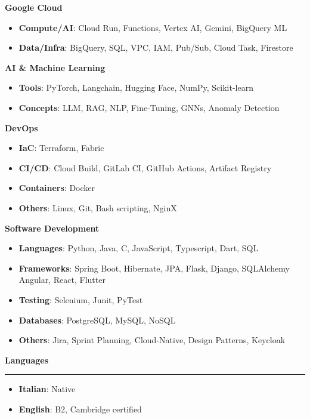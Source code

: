 \documentclass[9pt, a4paper]{article}
\newcommand{\cvsection}[1]{%
	\vspace{2pt}\par
	{\Large\bfseries\color{sectionblue}#1}\par
	\vspace{2pt}\hrule\vspace{6pt}
}
\begin{document}
\begin{minipage}[t]{0.32\linewidth}
		{\bfseries Google Cloud}
		\begin{itemize}[leftmargin=*, nosep, itemsep=2pt]
			\footnotesize
			\item \textbf{Compute/AI}: Cloud Run, Functions, Vertex AI, Gemini, BigQuery ML
			\item \textbf{Data/Infra}: BigQuery, SQL, VPC, IAM, Pub/Sub, Cloud Task, Firestore
		\end{itemize}
		\vspace{6pt}
		
		{\bfseries AI \& Machine Learning}
		\begin{itemize}[leftmargin=*, nosep, itemsep=2pt]
			\footnotesize
			\item \textbf{Tools}: PyTorch, Langchain, Hugging Face, NumPy, Scikit-learn
			\item \textbf{Concepts}: LLM, RAG, NLP, Fine-Tuning, GNNs, Anomaly Detection
		\end{itemize}
		\vspace{6pt}
		
		{\bfseries DevOps}
		\begin{itemize}[leftmargin=*, nosep, itemsep=2pt]
			\footnotesize
			\item \textbf{IaC}: Terraform, Fabric
			\item \textbf{CI/CD}: Cloud Build, GitLab CI, GitHub Actions, Artifact Registry
			\item \textbf{Containers}: Docker
			\item \textbf{Others}: Linux, Git, Bash scripting, NginX
		\end{itemize}
		\vspace{6pt}
		
		{\bfseries Software Development}
		\begin{itemize}[leftmargin=*, nosep, itemsep=2pt]
			\footnotesize
			\item \textbf{Languages}: Python, Java, C, JavaScript, Typescript, Dart, SQL
			\item \textbf{Frameworks}: Spring Boot, Hibernate, JPA, Flask, Django, SQLAlchemy Angular, React, Flutter
			\item \textbf{Testing}: Selenium, Junit, PyTest
			\item \textbf{Databases}: PostgreSQL, MySQL, NoSQL
			\item \textbf{Others}: Jira, Sprint Planning, Cloud-Native, Design Patterns, Keycloak
		\end{itemize}
		\vspace{10pt}
		
		\cvsection{Languages}
		\begin{itemize}[leftmargin=*, nosep, itemsep=2pt]
			\item \textbf{Italian}: Native
			\item \textbf{English}: B2, Cambridge certified
		\end{itemize}
		
	\end{minipage}
	
\end{document}
